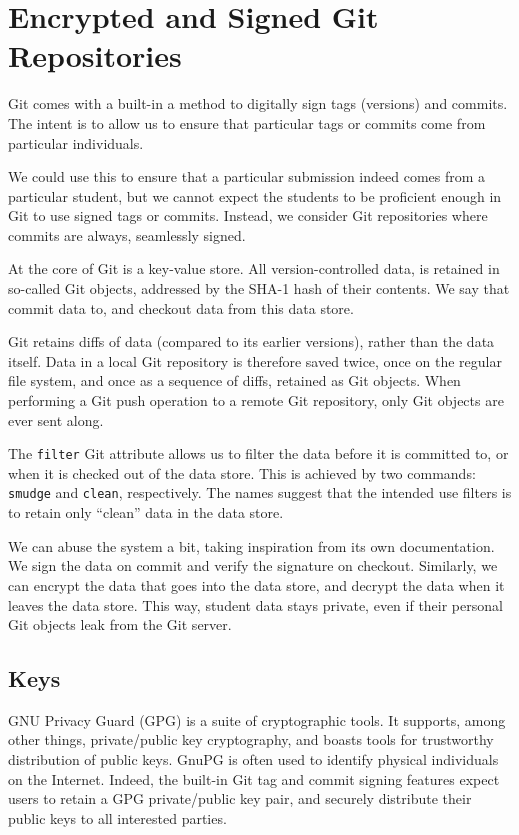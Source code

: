 
\section{Encrypted and Signed Git Repositories}

Git comes with a built-in a method to digitally sign tags (versions) and
commits. The intent is to allow us to ensure that particular tags or commits
come from particular individuals\cite{gerwitz-2013}.

We could use this to ensure that a particular submission indeed comes from a
particular student, but we cannot expect the students to be proficient enough
in Git to use signed tags or commits. Instead, we consider Git repositories
where commits are always, seamlessly signed.

At the core of Git is a key-value store\cite{chacon-2009}. All
version-controlled data, is retained in so-called Git objects, addressed by the
SHA-1 hash of their contents. We say that commit data to, and checkout data
from this data store.

Git retains diffs of data (compared to its earlier versions), rather than the
data itself. Data in a local Git repository is therefore saved twice, once on
the regular file system, and once as a sequence of diffs, retained as Git
objects. When performing a Git push operation to a remote Git repository, only
Git objects are ever sent along.

The \texttt{filter} Git attribute \cite{man-5-gitattributes} allows us to
filter the data before it is committed to, or when it is checked out of the
data store. This is achieved by two commands: \texttt{smudge} and
\texttt{clean}, respectively. The names suggest that the intended use filters
is to retain only ``clean'' data in the data store.

We can abuse the system a bit, taking inspiration from its own
documentation\cite{man-5-gitattributes}. We sign the data on commit and verify
the signature on checkout. Similarly, we can encrypt the data that goes into
the data store, and decrypt the data when it leaves the data store. This way,
student data stays private, even if their personal Git objects leak from the
Git server.

\subsection{Keys}

GNU Privacy Guard (GPG) is a suite of cryptographic tools. It supports, among
other things, private/public key cryptography, and boasts tools for trustworthy
distribution of public keys. GnuPG is often used to identify physical
individuals on the Internet. Indeed, the built-in Git tag and commit signing
features expect users to retain a GPG private/public key pair, and securely
distribute their public keys to all interested parties.

